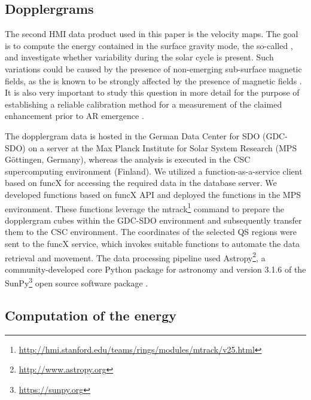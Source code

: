 \documentclass{aa}
\begin{document}

\subsection{Dopplergrams}

The second HMI data product used in this paper is the \los{} velocity maps. The goal is to compute the 
energy contained in the
surface gravity mode, the so-called \fffns,
and investigate whether variability during the solar cycle is present. Such variations could be caused by the presence of non-emerging sub-surface magnetic fields, as the \fff is known
to be strongly affected by the presence of magnetic fields \citep[see, e.g.,][]{Cally+94,CB97,SRB16}. 
It is also very important to study this question in more detail for the purpose of establishing a reliable calibration method 
for a measurement of
the claimed 
\fff enhancement prior to AR emergence \cite{SRB16,Waidele22}. 

The dopplergram data is hosted in the German Data Center for SDO (GDC-SDO) on a server at the Max Planck Institute for Solar System Research (MPS Göttingen, Germany), whereas the analysis is executed in the CSC supercomputing environment (Finland). We utilized  a function-as-a-service client based on funcX \cite[]{chard20funcx} for accessing the required data in the database server. We developed functions based on funcX API and deployed the functions in the MPS environment. These functions leverage the mtrack\footnote{\url{http://hmi.stanford.edu/teams/rings/modules/mtrack/v25.html}} command to prepare the dopplergram cubes within the GDC-SDO environment and subsequently transfer them to the CSC environment. The coordinates of the selected 
QS
regions were sent to the funcX service, which invokes suitable functions to automate the data retrieval and movement.
The data processing pipeline used Astropy\footnote{\url{http://www.astropy.org}}, a community-developed core Python package for astronomy \citep{astropy13, astropy18} and version 3.1.6 of the SunPy\footnote{\url{https://sunpy.org}} open source software package \cite[]{sunpy20}.

\subsection{Computation of the \fff
energy}
\end{document}
